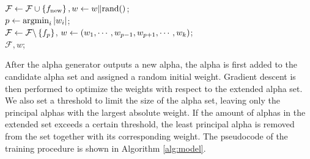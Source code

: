\begin{algorithm}
\caption{Incremental Combination Model Optimization}
\label{alg:model}
$\mathcal{F}\gets \mathcal{F}\cup \left\lbrace f_\textrm{new}\right\rbrace, w\gets w \Vert \mathrm{rand}()$;\\
$p \gets \operatorname*{argmin}_i |w_i|$;\\
$\mathcal{F} \gets \mathcal{F}\backslash \left\lbrace f_p\right\rbrace$, $w \gets \left(w_1, \cdots, w_{p-1}, w_{p+1}, \cdots, w_k\right)$;\\
\Return $\mathcal{F}, w$;
\end{algorithm}

After the alpha generator outputs a new alpha, the alpha is first added to the candidate alpha set and assigned a random initial weight. Gradient descent is then performed to optimize the weights with respect to the extended alpha set. We also set a threshold to limit the size of the alpha set, leaving only the principal alphas with the largest absolute weight. If the amount of alphas in the extended set exceeds a certain threshold, the least principal alpha is removed from the set together with its corresponding weight. The pseudocode of the training procedure is shown in Algorithm \ref{alg:model}.
